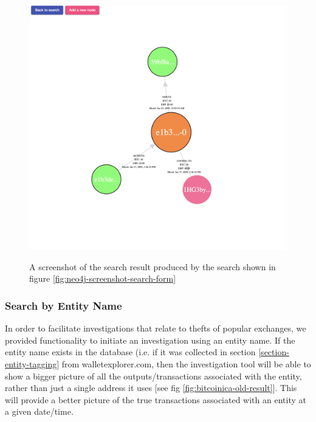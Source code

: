 \begin{figure}[h!]
  \centering
  \includegraphics[width = 15cm]{./figures/ui-screenshots/graph-basic}\\[0.5cm] 
  \caption{A screenshot of the search result produced by the search shown in figure \ref{fig:neo4j-screenshot-search-form}}
  \label{fig:neo4j-screenshot-basic-address-nodes}
\end{figure}

\subsubsection{Search by Entity Name}
In order to facilitate investigations that relate to thefts of popular exchanges, we provided functionality to initiate an investigation using an entity name. If the entity name exists in the database (i.e. if it was collected in section \ref{section-entity-tagging} from walletexplorer.com, then the investigation tool will be able to show a bigger picture of all the outputs/transactions associated with the entity, rather than just a single address it uses [see fig \ref{fig:bitcoinica-old-result}]. This will provide a better picture of the true transactions associated with an entity at a given date/time. 

